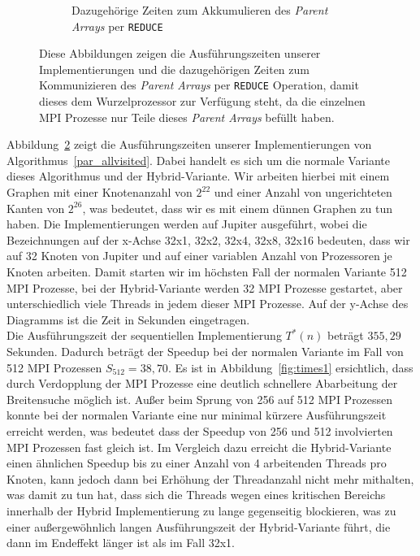 \documentclass[11pt,a4paper]{article}
\begin{document}
\begin{figure}[h]
\begin{subfigure}[b]{0.5\textwidth}
        \caption{Dazugehörige Zeiten zum Akkumulieren des \textit{Parent Arrays} per \lstinline{REDUCE}}
        \label{fig:reducing1}
    \end{subfigure}
    \caption{Diese Abbildungen zeigen die Ausführungszeiten unserer Implementierungen und die dazugehörigen Zeiten zum Kommunizieren des \textit{Parent Arrays} per \lstinline{REDUCE} Operation, damit dieses dem Wurzelprozessor zur Verfügung steht, da die einzelnen MPI Prozesse nur Teile dieses \textit{Parent Arrays} befüllt haben.}
\label{fig:analyse1}
\end{figure}
Abbildung~\ref{fig:analyse1} zeigt die Ausführungszeiten unserer Implementierungen von Algorithmus~\ref{par_allvisited}. Dabei handelt es sich um die normale Variante dieses Algorithmus und der Hybrid-Variante. Wir arbeiten hierbei mit einem Graphen mit einer Knotenanzahl von \(2^{22}\) und einer Anzahl von ungerichteten Kanten von \(2^{26}\), was bedeutet, dass wir es mit einem dünnen Graphen zu tun haben. Die Implementierungen werden auf Jupiter ausgeführt, wobei die Bezeichnungen auf der x-Achse 32x1, 32x2, 32x4, 32x8, 32x16 bedeuten, dass wir auf 32 Knoten von Jupiter und auf einer variablen Anzahl von Prozessoren je Knoten arbeiten. Damit starten wir im höchsten Fall der normalen Variante 512 MPI Prozesse, bei der Hybrid-Variante werden 32 MPI Prozesse gestartet, aber unterschiedlich viele Threads in jedem dieser MPI Prozesse. Auf der y-Achse des Diagramms ist die Zeit in Sekunden eingetragen.\\
Die Ausführungszeit der sequentiellen Implementierung \(T^{*}(n)\) beträgt \(355,29\) Sekunden. Dadurch beträgt der Speedup bei der normalen Variante im Fall von 512 MPI Prozessen \(S_{512} = 38,70\). Es ist in Abbildung~\ref{fig:times1} ersichtlich, dass durch Verdopplung der MPI Prozesse eine deutlich schnellere Abarbeitung der Breitensuche möglich ist. Außer beim Sprung von 256 auf 512 MPI Prozessen konnte bei der normalen Variante eine nur minimal kürzere Ausführungszeit erreicht werden, was bedeutet dass der Speedup von 256 und 512 involvierten MPI Prozessen fast gleich ist. Im Vergleich dazu erreicht die Hybrid-Variante einen ähnlichen Speedup bis zu einer Anzahl von 4 arbeitenden Threads pro Knoten, kann jedoch dann bei Erhöhung der Threadanzahl nicht mehr mithalten, was damit zu tun hat, dass sich die Threads wegen eines kritischen Bereichs innerhalb der Hybrid Implementierung zu lange gegenseitig blockieren, was zu einer außergewöhnlich langen Ausführungszeit der Hybrid-Variante führt, die dann im Endeffekt länger ist als im Fall 32x1.\\
\end{document}
